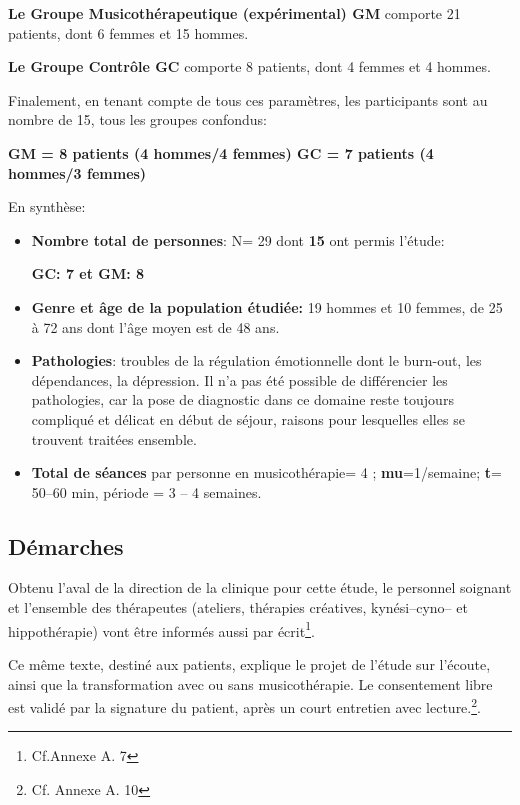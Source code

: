 \textbf{Le Groupe Musicothérapeutique (expérimental) GM} comporte 21
patients, dont 6
femmes et 15 hommes.

\textbf{Le  Groupe Contrôle GC} comporte 8 patients, dont 4 femmes et 4 hommes.

Finalement, en tenant compte de tous ces paramètres, les participants sont au nombre de 15, tous les groupes confondus:

\textbf{GM = 8 patients (4 hommes/4 femmes)
GC = 7 patients (4 hommes/3 femmes)}



En synthèse:
 \begin{itemize}

 \item \textbf{Nombre total de personnes}: N= 29 dont \textbf{15} ont permis l'étude:


 \textbf{GC: 7 et GM: 8}
\item\textbf{Genre et âge de la population étudiée:}  19 hommes et 10 femmes, de 25 à 72
  ans dont l'âge moyen est de 48 ans.
 \item\textbf{Pathologies}: troubles de la régulation émotionnelle
   dont le burn-out, les dépendances, la dépression.
   Il n'a pas été
   possible de différencier les pathologies, car la pose de
   diagnostic dans ce domaine reste toujours compliqué et délicat en début de séjour, raisons pour lesquelles elles
   se trouvent traitées ensemble.
 \item \textbf{Total de séances} par personne en
   musicothérapie= 4 ;   \textbf{mu}=1/semaine;
 \textbf{t}= 50--60 min, période = 3 -- 4 semaines.
\end{itemize}




\subsection{Démarches}
Obtenu l'aval de la direction de la
clinique pour cette étude,  le personnel soignant et l'ensemble des
thérapeutes (ateliers, thérapies créatives, kynési--cyno--
et hippothérapie) vont être informés aussi par écrit\footnote{Cf.Annexe A. 7}.

Ce même texte, destiné aux
patients, explique le projet de l'étude sur l'écoute, ainsi que la transformation
avec ou sans musicothérapie.
Le consentement libre est validé par la signature du patient, après
un court entretien avec lecture.\footnote{Cf. Annexe A. 10}.


